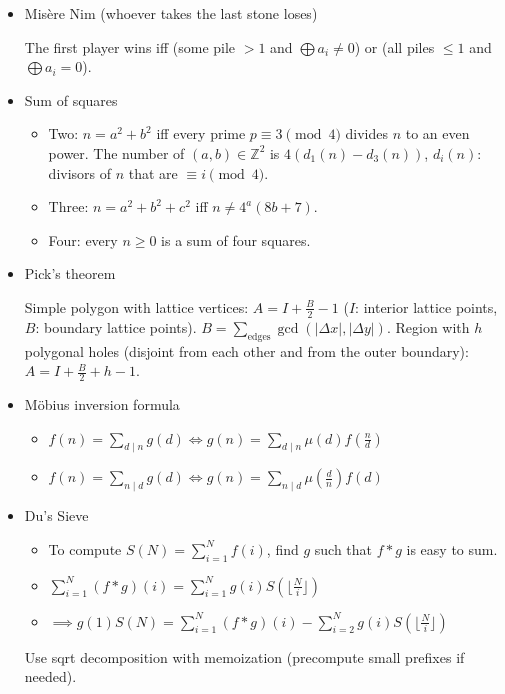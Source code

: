 \begin{itemize}
\item Mis\`ere Nim (whoever takes the last stone loses)

The first player wins iff (some pile $> 1$ and $\bigoplus a_i \ne 0$) or (all piles $\le 1$ and $\bigoplus a_i = 0$).

\item Sum of squares

\begin{itemize}
  \item Two: $n = a^2 + b^2$ iff every prime $p \equiv 3 \pmod 4$ divides $n$ to an even power. The number of $(a, b) \in \mathbb{Z}^2$ is $4(d_1(n) - d_3(n))$, $d_i(n)$: divisors of $n$ that are $\equiv i \pmod 4$.
  \item Three: $n = a^2 + b^2 + c^2$ iff $n \ne 4^a(8b + 7)$.
  \item Four: every $n \ge 0$ is a sum of four squares.
\end{itemize}

\item Pick's theorem

Simple polygon with lattice vertices: $A = I + \frac{B}{2} - 1$ ($I$: interior lattice points, $B$: boundary lattice points). $B = \sum_{\text{edges}} \gcd(|\Delta x|, |\Delta y|)$. Region with $h$ polygonal holes (disjoint from each other and from the outer boundary): $A = I + \frac{B}{2} + h - 1$.

\item Möbius inversion formula

\begin{itemize}
  \item $f(n)=\sum_{d\mid n}g(d)\Leftrightarrow g(n)=\sum_{d\mid n}\mu(d)f(\frac{n}{d})$
  \item $f(n)=\sum_{n\mid d}g(d)\Leftrightarrow g(n)=\sum_{n\mid d}\mu(\frac{d}{n})f(d)$
\end{itemize}

\item Du's Sieve

\begin{itemize}
  \item To compute $S(N)=\sum_{i=1}^N f(i)$, find $g$ such that $f*g$ is easy to sum.
  \item $\sum_{i=1}^N (f*g)(i)=\sum_{i=1}^N g(i)S(\lfloor\frac{N}{i}\rfloor)$
  \item $\implies g(1)S(N)=\sum_{i=1}^N (f*g)(i)-\sum_{i=2}^N g(i)S(\lfloor\frac{N}{i}\rfloor)$
\end{itemize}
Use sqrt decomposition with memoization (precompute small prefixes if needed).


\end{itemize}
